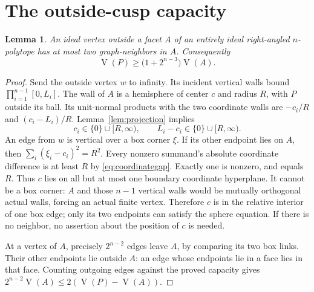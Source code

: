 \documentclass[11pt]{article}
\newtheorem{lemma}[theorem]{Lemma}
\theoremstyle{remark}
\newcommand{\VV}{\operatorname{V}}
\begin{document}
\section{The outside-cusp capacity}\label{sec:capacity}

\begin{lemma}\label{lem:capacity}
An ideal vertex outside a facet $A$ of an entirely ideal right-angled
$n$-polytope has at most two graph-neighbors in $A$. Consequently
\begin{equation}\label{eq:capacityprop}
 \VV(P)\ge\bigl(1+2^{n-3}\bigr)\VV(A).
\end{equation}
\end{lemma}
\begin{proof}
Send the outside vertex $w$ to infinity. Its incident vertical walls
bound $\prod_{i=1}^{n-1}[0,L_i]$. The wall of $A$ is a hemisphere of
center $c$ and radius $R$, with $P$ outside its ball. Its unit-normal
products with the two coordinate walls are $-c_i/R$ and
$(c_i-L_i)/R$. Lemma~\ref{lem:projection} implies
\begin{equation}\label{eq:coordinategap}
 c_i\in\{0\}\cup[R,\infty),\qquad
 L_i-c_i\in\{0\}\cup[R,\infty).
\end{equation}
An edge from $w$ is vertical over a box corner $\xi$. If its other
endpoint lies on $A$, then $\sum_i(\xi_i-c_i)^2=R^2$.
Every nonzero summand's absolute coordinate difference is at least $R$
by \eqref{eq:coordinategap}. Exactly one is nonzero, and equals $R$.
Thus $c$ lies on all but at most one boundary coordinate hyperplane.
It cannot be a box corner: $A$ and those $n-1$ vertical walls would
be mutually orthogonal actual walls, forcing an actual finite vertex.
Therefore $c$ is in the relative interior of one box edge; only its
two endpoints can satisfy the sphere equation. If there is no neighbor,
no assertion about the position of $c$ is needed.

At a vertex of $A$, precisely $2^{n-2}$ edges leave $A$, by comparing
its two box links. Their other endpoints lie outside $A$: an edge
whose endpoints lie in a face lies in that face. Counting outgoing
edges against the proved capacity gives
$2^{n-2}\VV(A)\le2(\VV(P)-\VV(A))$.
\end{proof}
\end{document}
